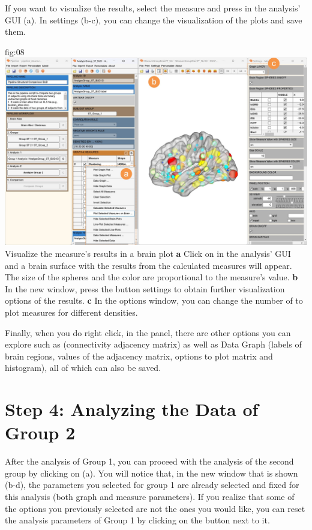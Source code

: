 \documentclass[justified]{tufte-handout}
\begin{document}
 If you want to visualize the results, select the measure and press  in the analysis' GUI (a). In settings (b-c), you can change the visualization of the plots and save them. 
 
	{fig:08}
	{\includegraphics{fig08.jpg}}
	{Visualize the measure's results in a brain plot}
	{
	{\bf a} Click on  in the analysis' GUI and a brain surface with the results from the calculated measures will appear. The size of the spheres and the color are proportional to the measure's value.   
    {\bf b} In the new window, press the button settings to obtain further visualization options of the results. 
    {\bf c} In the options window, you can change the number 
    of  to plot measures for different densities.
	}

 
 Finally, when you do right click, in the  panel, there are other options you can explore such as  (connectivity adjacency matrix) as well as Data Graph (labels of brain regions, values of the adjacency matrix, options to plot matrix and histogram), all of which can also be saved.
  
\section{Step 4: Analyzing the Data of Group 2}

After the analysis of Group 1, you can proceed with the analysis of the second group by clicking on  (a). You will notice that, in the new window that is shown (b-d), the parameters you selected for group 1 are already selected and fixed for this analysis (both graph and measure parameters). If you realize that some of the options you previously selected are not the ones you would like, you can reset the analysis parameters of Group 1 by clicking on the  button next to it.
\end{document}
